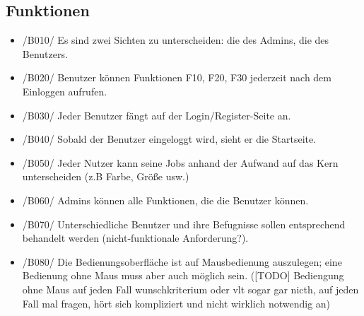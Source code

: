 \subsection{Funktionen}
\begin{itemize}
    \item /B010/ Es sind zwei Sichten zu unterscheiden: die des Admins, die des Benutzers. 
    \item /B020/ Benutzer können Funktionen F10, F20, F30 jederzeit nach dem Einloggen aufrufen.
    \item /B030/ Jeder Benutzer fängt auf der Login/Register-Seite an.
    \item /B040/ Sobald der Benutzer eingeloggt wird, sieht er die Startseite.
    \item /B050/ Jeder Nutzer kann seine Jobs anhand der Aufwand auf das Kern unterscheiden (z.B Farbe, Größe usw.)
    \item /B060/ Admins können alle Funktionen, die die Benutzer können.
    \item /B070/ Unterschiedliche Benutzer und ihre Befugnisse sollen entsprechend behandelt werden (nicht-funktionale Anforderung?).
    \item /B080/ Die Bedienungsoberfläche ist auf Mausbedienung auszulegen; eine Bedienung ohne Maus muss aber auch möglich sein. ([TODO] Bediengung ohne Maus auf jeden Fall wunschkriterium oder vlt sogar gar nicth, auf jeden Fall mal fragen, hört sich kompliziert und nicht wirklich notwendig an)
\end{itemize}